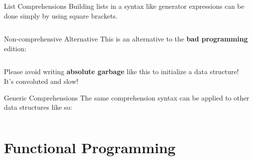 \documentclass{lug}
\begin{document}
\begin{frame}{List Comprehensions}
    Building lists in a syntax like generator expressions can be done simply by
    using square brackets.
    \medskip

    \inputminted{python3}{examples/generator_basic_lc.py}

    \pause

    \medskip

    \begin{block}{Non-comprehensive Alternative}
        This is an alternative to the \textbf{bad programming} edition:

        \smallskip

        \begin{minipage}{\linewidth}
        \inputminted{python3}{examples/generator_basic_lc_disgusting.py}
        \end{minipage}

        \smallskip

        {\small Please avoid writing \textbf{absolute garbage} like this
        to initialize a data structure! It's convoluted and slow!}
    \end{block}

\end{frame}

\begin{frame}{Generic Comprehensions}
    The same comprehension syntax can be applied to other data structures like
    so:
    \inputminted{python3}{examples/generic_comprehensions.py}
\end{frame}

\section{Functional Programming}
\end{document}
